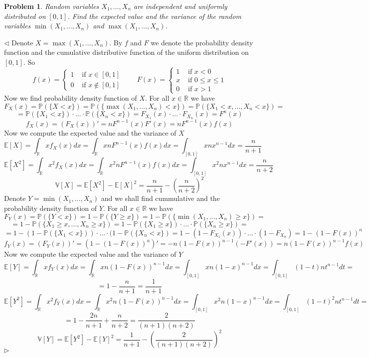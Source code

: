 \documentclass[12pt]{article}
\newtheorem{problem}{Problem}[subsection]
\newenvironment{solution}{\par $\triangleleft$}{$\triangleright$}
\begin{document}
 
\begin{problem} Random variables $X_1,\ldots,X_n$ are independent and uniformly distributed on $[0,1]$. Find the expected value and the variance of the random variables $\min(X_1,\ldots,X_n)$ and $\max(X_1,\ldots,X_n)$.
\end{problem}
\begin{solution} Denote $X=\max(X_1,\ldots,X_n)$. By $f$ and $F$ we denote the probability density function and the cumulative distributive function of the uniform distribution on $[0,1]$. So
$$
f(x)=\begin{cases} 1&\mbox{ if } x\in[0,1]\\0 &\mbox{ if }x\notin[0,1]\end{cases}\qquad
F(x)=\begin{cases} 1&\mbox{ if } x<0\\x&\mbox{ if } 0\leq x\leq 1\\0 &\mbox{ if } x>1\end{cases}
$$
Now we find probability density function of $X$. For all $x\in\mathbb{R}$ we have
$$
F_X(x)=\mathbb{P}(\{X<x\})=\mathbb{P}(\{\max(X_1,\ldots,X_n)<x\})=\mathbb{P}(\{X_1<x,\ldots,X_n<x\})=
$$
$$
=\mathbb{P}(\{X_1<x\})\cdot\ldots\cdot\mathbb{P}(\{X_n<x\})=F_{X_1}(x)\cdot\ldots\cdot F_{X_n}(x)=F^n(x)
$$
$$
f_X(x)=(F_X(x))'=n F^{n-1}(x)F'(x)=nF^{n-1}(x)f(x)
$$
Now we compute the expected value and the variance of $X$
$$
\mathbb{E}[X]=\int_{\mathbb{R}}xf_X(x)dx=\int_{\mathbb{R}}xnF^{n-1}(x)f(x)dx=\int_{[0,1]}xnx^{n-1}dx=\frac{n}{n+1}
$$
$$
\mathbb{E}[X^2]=\int_{\mathbb{R}}x^2f_X(x)dx=\int_{\mathbb{R}}x^2nF^{n-1}(x)f(x)dx=\int_{[0,1]}x^2nx^{n-1}dx=\frac{n}{n+2}
$$
$$
\mathbb{V}[X]=\mathbb{E}[X^2]-\mathbb{E}[X]^2=\frac{n}{n+1}-\left(\frac{n}{n+2}\right)^2
$$
Denote $Y=\min(X_1,\ldots,X_n)$ and we shall find cummulative and the probability density function of $Y$. For all $x\in\mathbb{R}$ we have
$$
F_Y(x)=\mathbb{P}(\{Y<x\})=1-\mathbb{P}(\{Y\geq x\})=1-\mathbb{P}(\{\min(X_1,\ldots,X_n)\geq x\})=
$$
$$
=1-\mathbb{P}(\{X_1\geq x,\ldots,X_n\geq x\})=
1-\mathbb{P}(\{X_1\geq x\})\cdot\ldots\cdot\mathbb{P}(\{X_n\geq x\})=
$$
$$
=1-(1-\mathbb{P}(\{X_1<x\}))\cdot\ldots\cdot(1-\mathbb{P}(\{X_n<x\})
=1-(1-F_{X_1}(x))\cdot\ldots\cdot(1-F_{X_n})=1-(1-F(x))^n
$$
$$
f_Y(x)=(F_Y(x))'=(1-(1-F(x))^n)'=-n(1-F(x))^{n-1}(-F'(x))=n(1-F(x))^{n-1}f(x)
$$
Now we compute the expected value and the variance of $Y$
$$
\mathbb{E}[Y]=\int_{\mathbb{R}} xf_Y(x)dx=\int_{\mathbb{R}}xn(1-F(x))^{n-1}dx=\int_{[0,1]}xn(1-x)^{n-1}dx=\int_{[0,1]}(1-t)nt^{n-1}dt=
$$
$$
=1-\frac{n}{n+1}=\frac{1}{n+1}
$$
$$
\mathbb{E}[Y^2]=\int_{\mathbb{R}} x^2f_Y(x)dx=\int_{\mathbb{R}}x^2n(1-F(x))^{n-1}dx=\int_{[0,1]}x^2n(1-x)^{n-1}dx=\int_{[0,1]}(1-t)^2nt^{n-1}dt=
$$
$$
=1-\frac{2n}{n+1}+\frac{n}{n+2}=\frac{2}{(n+1)(n+2)}
$$
$$
\mathbb{V}[Y]=\mathbb{E}[Y^2]-\mathbb{E}[Y]^2=\frac{1}{n+1}-\left(\frac{2}{(n+1)(n+2)}\right)^2
$$
\end{solution}
 
\end{document}
